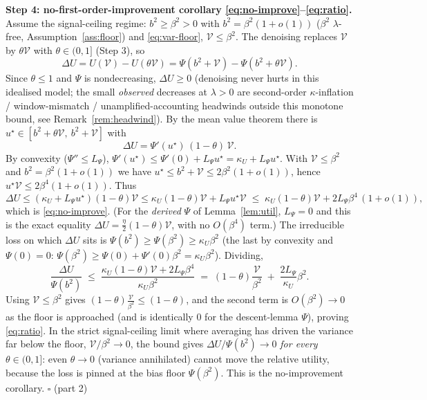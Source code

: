 \par\smallskip\noindent\textbf{Step 4: no-first-order-improvement corollary \eqref{eq:no-improve}--\eqref{eq:ratio}.}\quad 
Assume the signal-ceiling regime: $b^2\ge\beta^2>0$ with $b^2=\beta^2(1+o(1))$ ($\beta^2$
$\lambda$-free, Assumption~\ref{ass:floor}) and \eqref{eq:var-floor}, $\mathcal V\le\beta^2$. The
denoising replaces $\mathcal V$ by $\theta\mathcal V$ with $\theta\in(0,1]$ (Step 3), so
\[
\Delta U=U(\mathcal V)-U(\theta\mathcal V)=\Psi(b^2+\mathcal V)-\Psi(b^2+\theta\mathcal V).
\]
Since $\theta\le1$ and $\Psi$ is nondecreasing, $\Delta U\ge0$ (denoising never hurts in this
idealised model; the small \emph{observed} decreases at $\lambda>0$ are second-order
$\kappa$-inflation / window-mismatch / unamplified-accounting headwinds outside this monotone bound,
see Remark~\ref{rem:headwind}). By the mean value theorem there is
$u^\star\in[b^2+\theta\mathcal V,\ b^2+\mathcal V]$ with
\[
\Delta U=\Psi'(u^\star)\,(1-\theta)\,\mathcal V .
\]
By convexity ($\Psi''\le L_\Psi$), $\Psi'(u^\star)\le\Psi'(0)+L_\Psi u^\star=\kappa_U+L_\Psi u^\star$.
With $\mathcal V\le\beta^2$ and $b^2=\beta^2(1+o(1))$ we have
$u^\star\le b^2+\mathcal V\le 2\beta^2(1+o(1))$, hence $u^\star\mathcal V\le2\beta^4(1+o(1))$. Thus
\[
\Delta U\le(\kappa_U+L_\Psi u^\star)(1-\theta)\mathcal V\le\kappa_U(1-\theta)\mathcal V+L_\Psi u^\star\mathcal V
\;\le\;\kappa_U(1-\theta)\mathcal V+2L_\Psi\beta^4\,(1+o(1)),
\]
which is \eqref{eq:no-improve}. (For the \emph{derived} $\Psi$ of Lemma~\ref{lem:util}, $L_\Psi=0$
and this is the exact equality $\Delta U=\tfrac\eta2(1-\theta)\mathcal V$, with no $O(\beta^4)$
term.) The irreducible loss on which $\Delta U$ sits is $\Psi(b^2)\ge\Psi(\beta^2)\ge\kappa_U\beta^2$
(the last by convexity and $\Psi(0)=0$: $\Psi(\beta^2)\ge\Psi(0)+\Psi'(0)\beta^2=\kappa_U\beta^2$).
Dividing,
\[
\frac{\Delta U}{\Psi(b^2)}\;\le\;\frac{\kappa_U(1-\theta)\mathcal V+2L_\Psi\beta^4}{\kappa_U\beta^2}\;=\;(1-\theta)\frac{\mathcal V}{\beta^2}\;+\;\frac{2L_\Psi}{\kappa_U}\beta^2 .
\]
Using $\mathcal V\le\beta^2$ gives $(1-\theta)\frac{\mathcal V}{\beta^2}\le(1-\theta)$, and the
second term is $O(\beta^2)\to0$ as the floor is approached (and is identically $0$ for the
descent-lemma $\Psi$), proving \eqref{eq:ratio}. In the strict signal-ceiling limit where averaging
has driven the variance far below the floor, $\mathcal V/\beta^2\to0$, the bound gives
$\Delta U/\Psi(b^2)\to0$ \emph{for every} $\theta\in(0,1]$: even $\theta\to0$ (variance annihilated)
cannot move the relative utility, because the loss is pinned at the bias floor $\Psi(\beta^2)$. This
is the no-improvement corollary. \hfill$\square$ (part 2)


